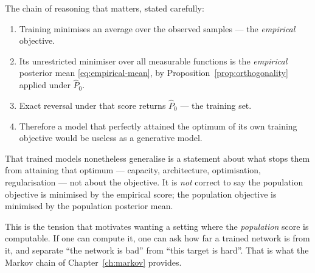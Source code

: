 \begin{pitfall}
The chain of reasoning that matters, stated carefully:
\begin{enumerate}[nosep]
\item Training minimises an average over the observed samples --- the \emph{empirical}
objective.
\item Its unrestricted minimiser over all measurable functions is the \emph{empirical}
posterior mean \eqref{eq:empirical-mean}, by Proposition~\ref{prop:orthogonality} applied
under $\widehat{P}_0$.
\item Exact reversal under that score returns $\widehat{P}_0$ --- the training set.
\item Therefore a model that perfectly attained the optimum of its own training objective
would be useless as a generative model.
\end{enumerate}
That trained models nonetheless generalise is a statement about what stops them from
attaining that optimum --- capacity, architecture, optimisation, regularisation --- not about
the objective. It is \emph{not} correct to say the population objective is minimised by the
empirical score; the population objective is minimised by the population posterior mean.
\end{pitfall}

\begin{intuition}
This is the tension that motivates wanting a setting where the \emph{population} score is
computable. If one can compute it, one can ask how far a trained network is from it, and
separate ``the network is bad'' from ``this target is hard''. That is what the Markov chain
of Chapter~\ref{ch:markov} provides.
\end{intuition}
